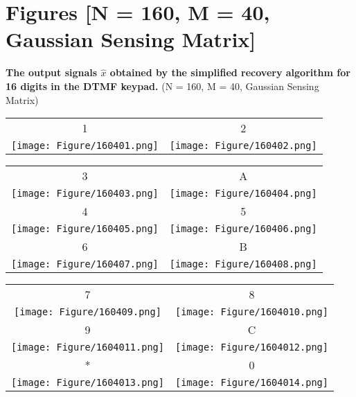 \chapter{Figures [N = 160, M = 40, Gaussian Sensing Matrix]} \label{B}


\textbf{The output signals $\hat{x}$ obtained by the simplified recovery algorithm for 16 digits in the DTMF keypad.}
(N = 160, M = 40, Gaussian Sensing Matrix)

\begin{table}[h]
\begin{tabular}{cc}
1 & 2 \\
\texttt{[image: Figure/160401.png]} &
\texttt{[image: Figure/160402.png]} \\
\end{tabular}
\end{table}

\begin{table}[h]
\begin{tabular}{cc}
3 & A \\
\texttt{[image: Figure/160403.png]} &
\texttt{[image: Figure/160404.png]} \\
4 & 5 \\
\texttt{[image: Figure/160405.png]} &
\texttt{[image: Figure/160406.png]} \\
6 & B \\
\texttt{[image: Figure/160407.png]} &
\texttt{[image: Figure/160408.png]} \\
\end{tabular}
\end{table}

\begin{table}[h]
\begin{tabular}{cc}
7 & 8 \\
\texttt{[image: Figure/160409.png]} &
\texttt{[image: Figure/1604010.png]} \\
9 & C \\
\texttt{[image: Figure/1604011.png]} &
\texttt{[image: Figure/1604012.png]} \\
* & 0 \\
\texttt{[image: Figure/1604013.png]} &
\texttt{[image: Figure/1604014.png]} \\
\end{tabular}
\end{table}

